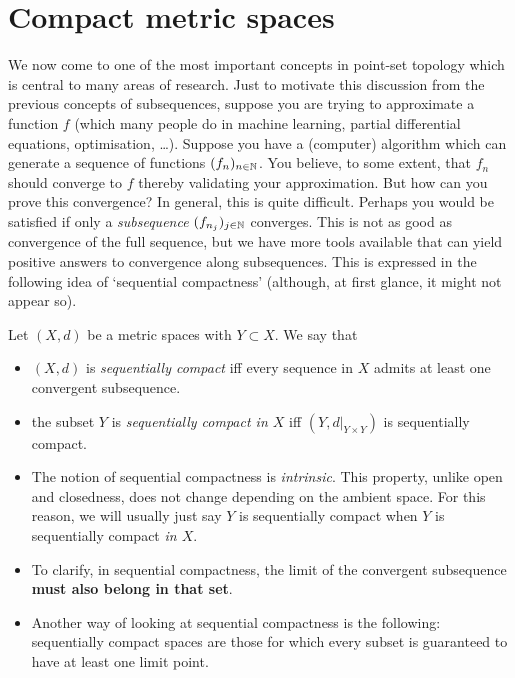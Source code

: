 \section{Compact metric spaces}
\label{sec:cpct_met_spaces}
We now come to one of the most important concepts in point-set topology which is central to many areas of research. Just to motivate this discussion from the previous concepts of subsequences, suppose you are trying to approximate a function $f$ (which many people do in machine learning, partial differential equations, optimisation, \dots). Suppose you have a (computer) algorithm which can generate a sequence of functions $(f_n)_{n\in\mathbb{N}}$. You believe, to some extent, that $f_n$ should converge to $f$ thereby validating your approximation. But how can you prove this convergence? In general, this is quite difficult. Perhaps you would be satisfied if only a \textit{subsequence} $(f_{n_j})_{j\in\mathbb{N}}$ converges. This is not as good as convergence of the full sequence, but we have more tools available that can yield positive answers to convergence along subsequences. This is expressed in the following idea of `sequential compactness' (although, at first glance, it might not appear so).
\begin{defn}
\label{defn:seq_cpct}
Let $(X,d)$ be a metric spaces with $Y\subset X$. We say that
\begin{itemize}
	\item $(X,d)$ is \textit{sequentially compact} iff every sequence in $X$ admits at least one convergent subsequence.
	\item the subset $Y$ is \textit{sequentially compact in $X$} iff $(Y,d|_{Y\times Y})$ is sequentially compact.
\end{itemize}
\end{defn}
\begin{rem}
\begin{itemize}
	\item The notion of sequential compactness is \textit{intrinsic}. This property, unlike open and closedness, does not change depending on the ambient space. For this reason, we will usually just say $Y$ is sequentially compact when $Y$ is sequentially compact \textit{in $X$}.
	\item To clarify, in sequential compactness, the limit of the convergent subsequence \textbf{must also belong in that set}.
	\item Another way of looking at sequential compactness is the following: sequentially compact spaces are those for which every subset is guaranteed to have at least one limit point.
\end{itemize}
\end{rem}
